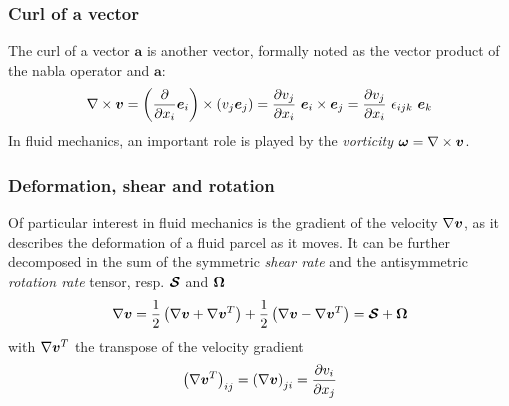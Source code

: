 \subsubsection{Curl of a vector}

The curl of a vector $\mathbf a$ is another vector, formally noted as the vector product of the nabla operator and $\mathbf a$:
\begin{align*}
  \nabla \times \boldsymbol {v} 
  = \left(\frac{\partial }{\partial x_i} \boldsymbol e_{i}\right) \times \left(v_j \boldsymbol e_{j}\right) 
  = \frac{\partial v_j}{\partial x_i}~ \boldsymbol e_{i} \times \boldsymbol e_{j} 
  = \frac{\partial v_j}{\partial x_i}~\epsilon_{ijk} ~\boldsymbol e_{k}
\end{align*}
In fluid mechanics, an important role is played by the
\emph{vorticity} $\boldsymbol{\omega} = \nabla \times \boldsymbol {v}$.

\subsubsection{Deformation, shear and rotation}

Of particular interest in fluid mechanics is the gradient of the
velocity $\nabla \boldsymbol {v}$, as it describes the deformation of a fluid
parcel as it moves. It can be further decomposed in the sum of the
symmetric \emph{shear rate} and the antisymmetric \emph{rotation rate}
tensor, resp. $\boldsymbol {\mathcal S}$ and $\boldsymbol {\Omega}$
\begin{align*}
  \nabla \boldsymbol {v} = 
  \frac{1}{2} \left(\nabla \boldsymbol {v} + \nabla \boldsymbol {v}^T\right) +
  \frac{1}{2} \left(\nabla \boldsymbol {v} - \nabla \boldsymbol {v}^T\right) = \boldsymbol {\boldsymbol {\mathcal S}} + \boldsymbol {\Omega}
\end{align*}
with $\nabla \boldsymbol {v}^T$ the transpose of the velocity gradient
\begin{align*}
  \left(\nabla \boldsymbol {v}^T\right)_{ij} = \left(\nabla \boldsymbol {v}\right)_{ji} = \frac{\partial v_i}{\partial x_j}
\end{align*}

